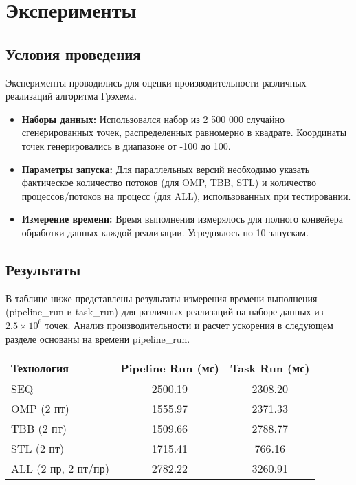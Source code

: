 \documentclass[12pt]{article}
\begin{document}
\newpage
\section{Эксперименты}
\subsection{Условия проведения}
Эксперименты проводились для оценки производительности различных реализаций алгоритма Грэхема.
\begin{itemize}
    \item \textbf{Наборы данных:} Использовался набор из 2 500 000 случайно сгенерированных точек, распределенных равномерно в квадрате. Координаты точек генерировались в диапазоне от -100 до 100.
    \item \textbf{Параметры запуска:} Для параллельных версий необходимо указать фактическое количество потоков (для OMP, TBB, STL) и количество процессов/потоков на процесс (для ALL), использованных при тестировании.
    \item \textbf{Измерение времени:} Время выполнения измерялось для полного конвейера обработки данных каждой реализации. Усреднялось по 10 запускам.
\end{itemize}

\subsection{Результаты}
В таблице ниже представлены результаты измерения времени выполнения (pipeline\_run и task\_run) для различных реализаций на наборе данных из $2.5 \times 10^6$ точек. Анализ производительности и расчет ускорения в следующем разделе основаны на времени pipeline\_run.

\begin{center}
\begin{tabular}{|l|c|c|}
\hline
\textbf{Технология} & \textbf{Pipeline Run (мс)} & \textbf{Task Run (мс)} \\
\hline
SEQ                    & 2500.19           & 2308.20       \\
\hline
OMP (2 пт)             & 1555.97           & 2371.33       \\
\hline
TBB (2 пт)             & 1509.66           & 2788.77       \\
\hline
STL (2 пт)             & 1715.41           & 766.16        \\
\hline
ALL (2 пр, 2 пт/пр)    & 2782.22           & 3260.91       \\
\hline
\end{tabular}
\end{center}
\end{document}
